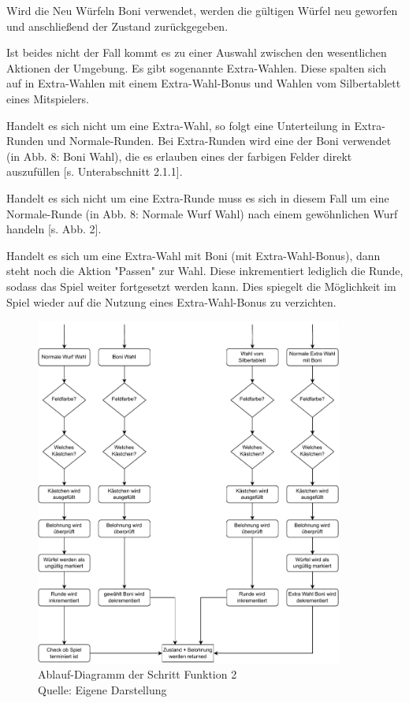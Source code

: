 Wird die Neu Würfeln Boni verwendet, werden die gültigen Würfel neu geworfen und anschließend der Zustand zurückgegeben.

Ist beides nicht der Fall kommt es zu einer Auswahl zwischen den wesentlichen Aktionen der Umgebung. Es gibt sogenannte Extra-Wahlen. Diese spalten sich auf in Extra-Wahlen mit einem Extra-Wahl-Bonus und Wahlen vom Silbertablett eines Mitspielers.

Handelt es sich nicht um eine Extra-Wahl, so folgt eine Unterteilung in Extra-Runden und Normale-Runden. Bei Extra-Runden wird eine der Boni verwendet (in Abb. 8: Boni Wahl), die es erlauben eines der farbigen Felder direkt auszufüllen [s. Unterabschnitt 2.1.1].

Handelt es sich nicht um eine Extra-Runde muss es sich in diesem Fall um eine Normale-Runde (in Abb. 8: Normale Wurf Wahl) nach einem gewöhnlichen Wurf handeln [s. Abb. 2].

Handelt es sich um eine Extra-Wahl mit Boni (mit Extra-Wahl-Bonus), dann steht noch die Aktion "Passen" zur Wahl. Diese inkrementiert lediglich die Runde, sodass das Spiel weiter fortgesetzt werden kann. Dies spiegelt die Möglichkeit im Spiel wieder auf die Nutzung eines Extra-Wahl-Bonus zu verzichten.\\

\begin{figure}[H]
	\centering
	\includegraphics[width=0.9\textwidth]{Bilder/step2.drawio} 
	\caption[Ablauf-Diagramm der Schritt-Funktion 2]{Ablauf-Diagramm der Schritt Funktion 2\\ Quelle: Eigene Darstellung}
\end{figure}

